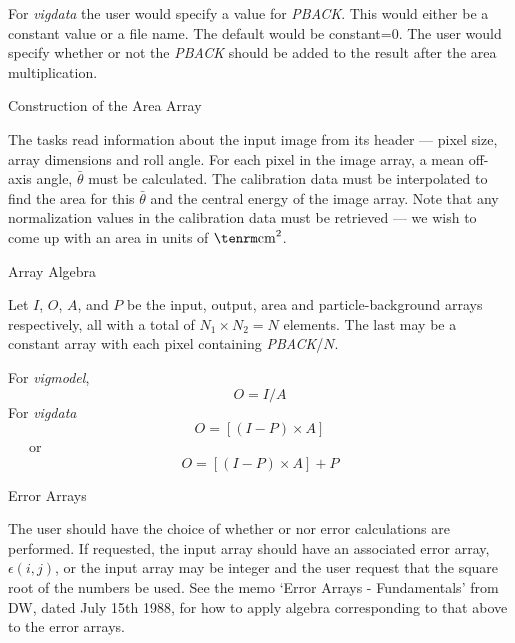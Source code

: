 For {\it vigdata} the user would specify a value for {\it PBACK}.  This
would either be a constant value or a file name.  The default would be
constant=0.  The user would specify whether or not the {\it PBACK}
should be added to the result after the area multiplication.

\@{Construction of the Area Array}

The tasks read information about the input image from its header  ---
pixel size, array dimensions and roll angle.  For each pixel in the
image array, a mean off-axis angle, $\bar \theta$ must be calculated.
The calibration data must be interpolated to find the area for this
$\bar \theta$ and the central energy of the image array.  Note that any
normalization values in the calibration data must be retrieved --- we
wish to come up with an area in units of ${\rm cm}^2$.

\@{Array Algebra}

Let $I$, $O$, $A$, and $P$ be the input, output, area and particle-background
arrays respectively, all with a total of $N_1 \times N_2 = N$
elements.
The last may be a constant array with each
pixel containing {\it PBACK}/$N$.

For {\it vigmodel},
$$ O = I / A$$
For {\it vigdata}
$$ O = [(I - P) \times A] $$
~~~or
$$ O = [(I - P) \times A] + P $$

\@{Error Arrays}

The user should have the choice of whether or nor error calculations
are performed.  If requested, the input array should have an
associated error array, $\epsilon(i,j)$, or the input array may be
integer and the user request that the square root of the numbers be
used.
See the memo `Error Arrays - Fundamentals' from DW, dated July 15th
1988, for how to apply algebra corresponding to that above to the
error arrays.

\vfill\eject






